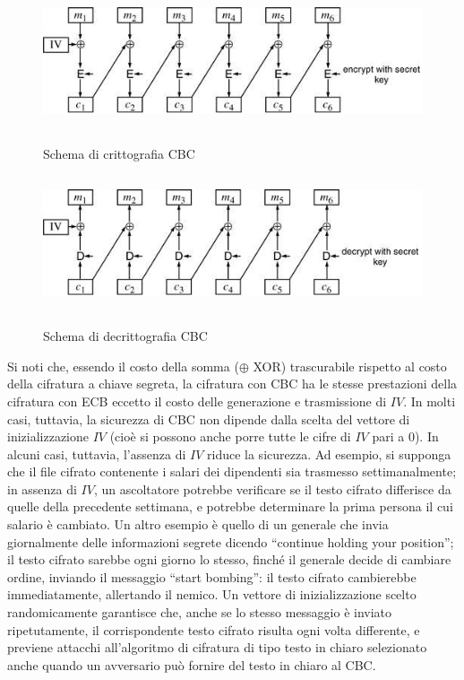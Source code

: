 \begin{figure}[htbp]
	\centering%
	\subfigure%
	{\includegraphics[height=4cm, width=12cm, keepaspectratio]{Immagini/Capitolo3/CBC_enc.png}}
	\caption{Schema di crittografia CBC \label{fig:CBC_enc}} 	
	\subfigure%
	{\includegraphics[height=4cm, width=12cm, keepaspectratio]{Immagini/Capitolo3/CBC_dec.png}}
	\caption{Schema di decrittografia CBC \label{fig:CBC_dec}} 
\end{figure}
Si noti che, essendo il costo della somma ($\oplus$ XOR) trascurabile rispetto al costo della cifratura a chiave segreta, la cifratura con CBC ha le stesse prestazioni della cifratura con ECB eccetto il costo delle generazione e trasmissione di $IV$. In molti casi, tuttavia, la sicurezza di CBC non dipende dalla
scelta del vettore di inizializzazione $IV$ (cioè si possono anche porre tutte le cifre di $IV$ pari a 0).\newline \newline
In alcuni casi, tuttavia, l'assenza di $IV$ riduce la sicurezza. Ad esempio, si supponga che il file cifrato contenente i salari dei dipendenti sia trasmesso settimanalmente; in assenza di $IV$, un ascoltatore potrebbe verificare se il testo cifrato differisce da quelle della precedente settimana, e potrebbe determinare la prima persona il cui salario è cambiato. Un altro esempio è quello di un generale che invia
giornalmente delle informazioni segrete dicendo “continue holding your position”; il testo cifrato sarebbe ogni giorno lo stesso, finché il generale decide di cambiare ordine, inviando il messaggio “start bombing”: il testo cifrato cambierebbe immediatamente, allertando il nemico.\newline
Un vettore di inizializzazione scelto randomicamente garantisce che, anche se lo stesso messaggio è inviato ripetutamente, il corrispondente testo cifrato risulta ogni volta differente, e previene attacchi all'algoritmo di cifratura di tipo testo in chiaro selezionato anche quando un avversario può fornire del testo in chiaro al CBC.
